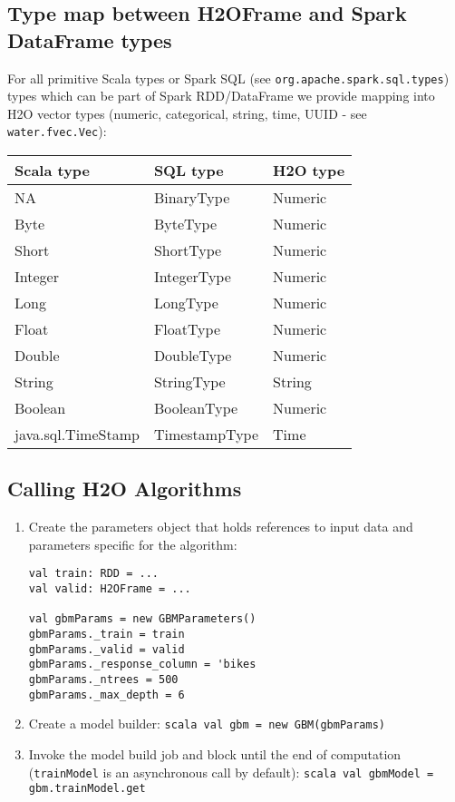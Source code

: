\subsection{Type map between H2OFrame and Spark DataFrame types}

For all primitive Scala types or Spark SQL (see \texttt{org.apache.spark.sql.types}) types which can be part of Spark RDD/DataFrame we provide mapping into H2O vector types (numeric, categorical, string, time, UUID - see \texttt{water.fvec.Vec}):

\begin{table}[!ht]
\centering
\begin{tabular}{l l l}
\toprule
Scala type  &	SQL type 	& H2O type \\
\midrule
NA & BinaryType & Numeric \\
Byte 	& ByteType & Numeric \\
Short & ShortType & Numeric \\
Integer & IntegerType & Numeric \\
Long & LongType & Numeric \\
Float & FloatType & Numeric \\
Double & DoubleType & Numeric \\
String & StringType & String \\
Boolean & BooleanType & Numeric \\
java.sql.TimeStamp & TimestampType & Time \\
\bottomrule
\end{tabular} 
\end{table}

\subsection{Calling H2O Algorithms}

\begin{enumerate}
\item Create the parameters object that holds references to input data and parameters specific for the algorithm:

\begin{lstlisting}[style=Scala]
val train: RDD = ...
val valid: H2OFrame = ...

val gbmParams = new GBMParameters()
gbmParams._train = train
gbmParams._valid = valid
gbmParams._response_column = 'bikes
gbmParams._ntrees = 500
gbmParams._max_depth = 6
\end{lstlisting}

 \item Create a model builder: {\lstinline[style=Scala]|scala val gbm = new GBM(gbmParams)|}
 \item Invoke the model build job and block until the end of computation (\texttt{trainModel} is an asynchronous call by default): {\lstinline[style=Scala]|scala val gbmModel = gbm.trainModel.get|} \end{enumerate}
